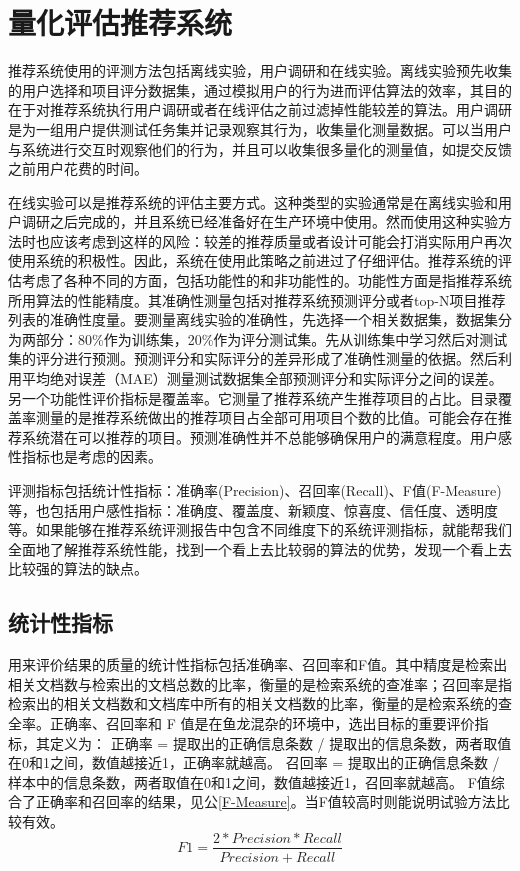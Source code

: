   \section{量化评估推荐系统}
  推荐系统使用的评测方法包括离线实验，用户调研和在线实验。离线实验预先收集的用户选择和项目评分数据集，通过模拟用户的行为进而评估算法的效率，其目的在于对推荐系统执行用户调研或者在线评估之前过滤掉性能较差的算法。用户调研是为一组用户提供测试任务集并记录观察其行为，收集量化测量数据。可以当用户与系统进行交互时观察他们的行为，并且可以收集很多量化的测量值，如提交反馈之前用户花费的时间。

  在线实验可以是推荐系统的评估主要方式。这种类型的实验通常是在离线实验和用户调研之后完成的，并且系统已经准备好在生产环境中使用。然而使用这种实验方法时也应该考虑到这样的风险：较差的推荐质量或者设计可能会打消实际用户再次使用系统的积极性。因此，系统在使用此策略之前进过了仔细评估。推荐系统的评估考虑了各种不同的方面，包括功能性的和非功能性的。功能性方面是指推荐系统所用算法的性能精度。其准确性测量包括对推荐系统预测评分或者top-N项目推荐列表的准确性度量。要测量离线实验的准确性，先选择一个相关数据集，数据集分为两部分：80\%作为训练集，20\%作为评分测试集。先从训练集中学习然后对测试集的评分进行预测。预测评分和实际评分的差异形成了准确性测量的依据。然后利用平均绝对误差（MAE）测量测试数据集全部预测评分和实际评分之间的误差。另一个功能性评价指标是覆盖率。它测量了推荐系统产生推荐项目的占比。目录覆盖率测量的是推荐系统做出的推荐项目占全部可用项目个数的比值。可能会存在推荐系统潜在可以推荐的项目。预测准确性并不总能够确保用户的满意程度。用户感性指标也是考虑的因素。

  评测指标包括统计性指标：准确率(Precision)、召回率(Recall)、F值(F-Measure)等，也包括用户感性指标：准确度、覆盖度、新颖度、惊喜度、信任度、透明度等。如果能够在推荐系统评测报告中包含不同维度下的系统评测指标，就能帮我们全面地了解推荐系统性能，找到一个看上去比较弱的算法的优势，发现一个看上去比较强的算法的缺点。

  \subsection{统计性指标}
  用来评价结果的质量的统计性指标包括准确率、召回率和F值。其中精度是检索出相关文档数与检索出的文档总数的比率，衡量的是检索系统的查准率；召回率是指检索出的相关文档数和文档库中所有的相关文档数的比率，衡量的是检索系统的查全率。正确率、召回率和 F 值是在鱼龙混杂的环境中，选出目标的重要评价指标，其定义为：
  正确率 = 提取出的正确信息条数 /  提取出的信息条数，两者取值在0和1之间，数值越接近1，正确率就越高。
  召回率 = 提取出的正确信息条数 /  样本中的信息条数，两者取值在0和1之间，数值越接近1，召回率就越高。
  F值综合了正确率和召回率的结果，见公\autoref{F-Measure}。当F值较高时则能说明试验方法比较有效。
  \begin{equation}
    F1 = \frac{2*Precision*Recall}{Precision+Recall}
    \label{F-Measure}
  \end{equation}


